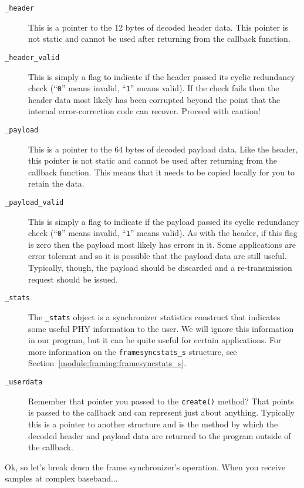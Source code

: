 \begin{description}
\item[{\tt \_header}]
    This is a pointer to the 12 bytes of decoded header data.
    This pointer is not static and cannot be used after returning from
    the callback function.
\item[{\tt \_header\_valid}]
    This is simply a flag to indicate if the header passed its cyclic
    redundancy check
    (``{\tt 0}'' means invalid, ``{\tt 1}'' means valid).
    If the check fails then the header data most likely has been
    corrupted beyond the point that the internal error-correction code
    can recover.
    Proceed with caution!
\item[{\tt \_payload}]
    This is a pointer to the 64 bytes of decoded payload data.
    Like the header,
    this pointer is not static and cannot be used after returning from
    the callback function.
    This means that it needs to be copied locally for you to retain the
    data.
\item[{\tt \_payload\_valid}]
    This is simply a flag to indicate if the payload passed its cyclic
    redundancy check
    (``{\tt 0}'' means invalid, ``{\tt 1}'' means valid).
    As with the header,
    if this flag is zero then the payload most likely has errors in it.
    Some applications are error tolerant and so it is possible that the
    payload data are still useful.
    Typically, though, the payload should be discarded and a
    re-transmission request should be issued.
\item[{\tt \_stats}]
    The {\tt \_stats} object is a synchronizer statistics construct that
    indicates some useful PHY information to the user.
    We will ignore this information in our program, but it can be quite
    useful for certain applications.
    For more information on the {\tt framesyncstats\_s} structure, see
    Section~\ref{module:framing:framesyncstats_s}.
\item[{\tt \_userdata}]
    Remember that pointer you passed to the {\tt create()} method?
    That points is passed to the callback and can represent just about
    anything.
    Typically this is a pointer to another structure and is the method
    by which the decoded header and payload data are returned to the
    program outside of the callback.
\end{description}

Ok, so let's break down the frame synchronizer's operation.
When you receive samples at complex baseband...


%
%
